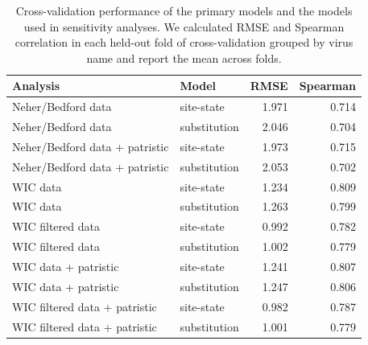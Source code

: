 \begin{table}[!h]
\centering
\caption{Cross-validation performance of the primary models and the models used in sensitivity analyses. We calculated RMSE and Spearman correlation in each held-out fold of cross-validation grouped by virus name and report the mean across folds.}
\label{tab:si-model-performance}
\small
\begin{tabular*}{\textwidth}{@{\extracolsep{\fill}}llrr}
\toprule
Analysis & Model & RMSE & Spearman \\
\midrule
Neher/Bedford data & site-state & 1.971 & 0.714 \\
Neher/Bedford data & substitution & 2.046 & 0.704 \\
Neher/Bedford data + patristic & site-state & 1.973 & 0.715 \\
Neher/Bedford data + patristic & substitution & 2.053 & 0.702 \\
WIC data & site-state & 1.234 & 0.809 \\
WIC data & substitution & 1.263 & 0.799 \\
WIC filtered data & site-state & 0.992 & 0.782 \\
WIC filtered data & substitution & 1.002 & 0.779 \\
WIC data + patristic & site-state & 1.241 & 0.807 \\
WIC data + patristic & substitution & 1.247 & 0.806 \\
WIC filtered data + patristic & site-state & 0.982 & 0.787 \\
WIC filtered data + patristic & substitution & 1.001 & 0.779 \\
\bottomrule
\end{tabular*}
\end{table}
